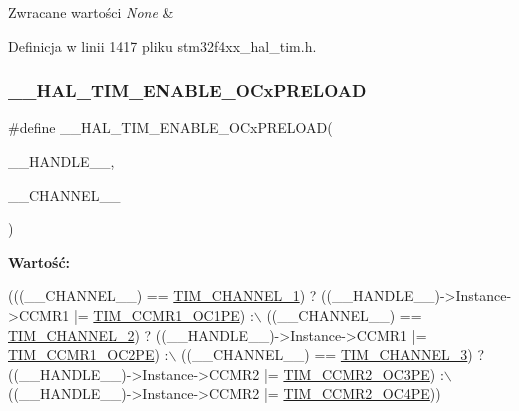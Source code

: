 \begin{DoxyRetVals}{Zwracane wartości}
{\em None} & \\
\hline
\end{DoxyRetVals}


Definicja w linii 1417 pliku stm32f4xx\+\_\+hal\+\_\+tim.\+h.

\mbox{\label{group___t_i_m___exported___macros_ga199e848f0a301987a500faea0db2dd70}} 
\subsubsection{\texorpdfstring{\+\_\+\+\_\+\+H\+A\+L\+\_\+\+T\+I\+M\+\_\+\+E\+N\+A\+B\+L\+E\+\_\+\+O\+Cx\+P\+R\+E\+L\+O\+AD}{\_\_HAL\_TIM\_ENABLE\_OCxPRELOAD}}
{\footnotesize\ttfamily \#define \+\_\+\+\_\+\+H\+A\+L\+\_\+\+T\+I\+M\+\_\+\+E\+N\+A\+B\+L\+E\+\_\+\+O\+Cx\+P\+R\+E\+L\+O\+AD(\begin{DoxyParamCaption}\item[{}]{\+\_\+\+\_\+\+H\+A\+N\+D\+L\+E\+\_\+\+\_\+,  }\item[{}]{\+\_\+\+\_\+\+C\+H\+A\+N\+N\+E\+L\+\_\+\+\_\+ }\end{DoxyParamCaption})}

{\bfseries Wartość\+:}
\begin{DoxyCode}
(((\_\_CHANNEL\_\_) == \hyperlink{group___t_i_m___channel_ga6b1541e4a49d62610899e24bf23f4879}{TIM\_CHANNEL\_1}) ? ((\_\_HANDLE\_\_)->Instance->CCMR1 |= 
      \hyperlink{group___peripheral___registers___bits___definition_ga1aa54ddf87a4b339881a8d5368ec80eb}{TIM\_CCMR1\_OC1PE}) :\(\backslash\)
   ((\_\_CHANNEL\_\_) == \hyperlink{group___t_i_m___channel_ga33e02d43345a7ac5886f01b39e4f7ccd}{TIM\_CHANNEL\_2}) ? ((\_\_HANDLE\_\_)->Instance->CCMR1 |= 
      \hyperlink{group___peripheral___registers___bits___definition_gabddbf508732039730125ab3e87e9d370}{TIM\_CCMR1\_OC2PE}) :\(\backslash\)
   ((\_\_CHANNEL\_\_) == \hyperlink{group___t_i_m___channel_ga4ea100c1789b178f3cb46721b7257e2d}{TIM\_CHANNEL\_3}) ? ((\_\_HANDLE\_\_)->Instance->CCMR2 |= 
      \hyperlink{group___peripheral___registers___bits___definition_ga276fd2250d2b085b73ef51cb4c099d24}{TIM\_CCMR2\_OC3PE}) :\(\backslash\)
   ((\_\_HANDLE\_\_)->Instance->CCMR2 |= \hyperlink{group___peripheral___registers___bits___definition_ga3e951cd3f6593e321cf79b662a1deaaa}{TIM\_CCMR2\_OC4PE}))
\end{DoxyCode}


